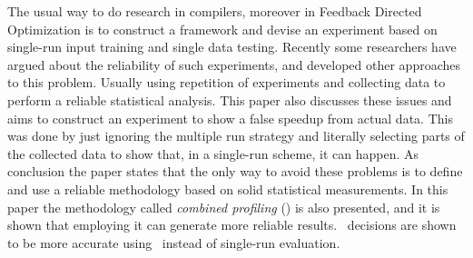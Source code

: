
The usual way to do research in compilers, moreover in Feedback Directed Optimization is to construct a framework and devise an experiment based on single-run input training and single data testing. Recently some researchers have argued about the reliability of such experiments, and developed other approaches to this problem. Usually using repetition of experiments and collecting data to perform a reliable statistical analysis. This paper also discusses these issues and aims to construct an experiment to show a false speedup from actual data. This was done by just ignoring the multiple run strategy and literally selecting parts of the collected data to show that, in a single-run scheme, it can happen. As conclusion the paper states that the only way to avoid these problems is to define and use a reliable methodology based on solid statistical measurements. In this paper the methodology called {\em combined profiling} (\CP) is also presented, and it is shown that employing it can generate more reliable results. \FDI\ decisions are shown to be more accurate using \CP\ instead of single-run evaluation.
